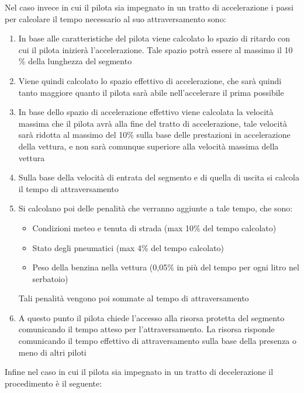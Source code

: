 \documentclass[a4paper,11pt, twoside]{book}
\begin{document}
	  Nel caso invece in cui il pilota sia impegnato in un tratto di accelerazione i passi
	  per calcolare il tempo necessario al suo attraversamento sono:
	  
	  \begin{enumerate}
	    \item In base alle caratteristiche del pilota viene calcolato lo spazio di ritardo con cui il
		  pilota inizierà l'accelerazione. Tale spazio potrà essere al massimo il 10$\%$ della lunghezza del segmento
	    \item Viene quindi calcolato lo spazio effettivo di accelerazione, che sarà quindi tanto maggiore quanto
		  il pilota sarà abile nell'accelerare il prima possibile
	    \item In base dello spazio di accelerazione effettivo viene calcolata la velocità massima che il pilota avrà alla fine del 
		  tratto di accelerazione,
		  tale velocità sarà ridotta al massimo del 10$\%$ sulla base delle prestazioni in accelerazione della vettura,
		  e non sarà comunque superiore alla velocità massima della vettura
	    \item Sulla base della velocità di entrata del segmento e di quella di uscita si calcola il tempo di attraversamento
	    \item Si calcolano poi delle penalità che verranno aggiunte a tale tempo, che sono:
		  \begin{itemize}
		    \item Condizioni meteo e tenuta di strada (max 10\% del tempo calcolato)
		    \item Stato degli pneumatici (max 4\% del tempo calcolato)
		    \item Peso della benzina nella vettura (0,05\% in più del tempo per ogni litro nel serbatoio)
		  \end{itemize}
		  Tali penalità vengono poi sommate al tempo di attraversamento
	    \item A questo punto il pilota chiede l'accesso alla risorsa protetta del segmento
		  comunicando il tempo atteso per l'attraversamento. La risorsa risponde comunicando il tempo
		  effettivo di attraversamento sulla base della presenza o meno di altri piloti
	  \end{enumerate}
	  
	  Infine nel caso in cui il pilota sia impegnato in un tratto di decelerazione il procedimento è il seguente:
	  
\end{document}
